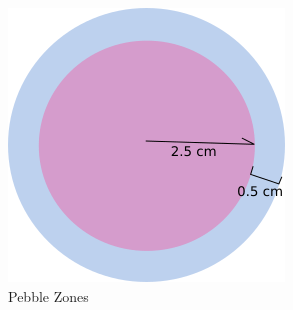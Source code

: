 \begin{figure}[h!]
\centering
\includegraphics{figures/pebble-zones.png}
\caption{Pebble Zones}
\label{fig:pebb-zone1}
\end{figure}